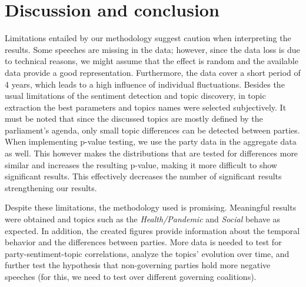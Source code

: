 \documentclass{article}
\begin{document}
\section{Discussion and conclusion}

Limitations entailed by our methodology suggest caution when interpreting the results. 
Some speeches are missing in the data; however, since the data loss is due to technical reasons, we might assume that the effect is random and the available data provide a good representation.
Furthermore, the data cover a short period of 4 years, which leads to a high influence of individual fluctuations.
Besides the usual limitations of the sentiment detection and topic discovery, in topic extraction the best parameters and topics names were selected subjectively.
It must be noted that since the discussed topics are mostly defined by the parliament's agenda, only small topic differences can be detected between parties.
When implementing p-value testing, we use the party data in the aggregate data as well.
This however makes the distributions that are tested for differences more similar and increases the resulting p-value, making it more difficult to show significant results.
This effectively decreases the number of significant results strengthening our results.

Despite these limitations, the methodology used is promising.
Meaningful results were obtained and topics such as the \textit{Health/Pandemic} and \textit{Social} behave as expected. 
In addition, the created figures provide information about the temporal behavior and the differences between parties.
More data is needed to test for party-sentiment-topic correlations, analyze the topics' evolution over time, and further test the hypothesis that non-governing parties hold more negative speeches (for this, we need to test over different governing coalitions).



\end{document}
